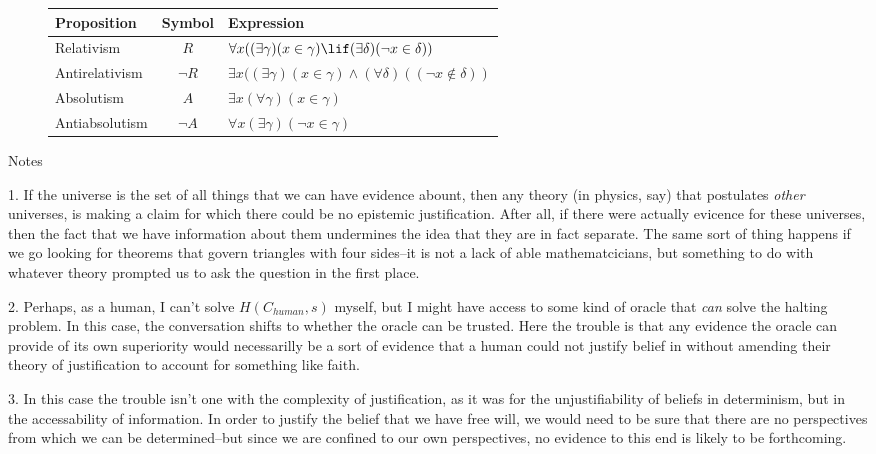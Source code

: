 \documentclass[12pt]{article}
\begin{document}
\begin{flushleft}
\begin{figure}[h]
    \begin{tabular}{l|c|l}
        \hline
        Proposition & Symbol & Expression \\ \hline
        Relativism  & $R$ & $\forall{x}((\exists{\gamma})(x \in \gamma) \lif (\exists{\delta})({\lnot}x \in \delta))$ \\
        Antirelativism & $\neg R$ & $\exists{x}((\exists{\gamma})(x \in \gamma) \land (\forall{\delta})(({\neg}x \notin \delta))$ \\
        Absolutism & $A$ & $\exists{x}(\forall{\gamma})(x \in \gamma)$ \\
        Antiabsolutism & $\neg A$ & $\forall{x}(\exists{\gamma})({\lnot}x \in \gamma)$ \\
    \end{tabular}
\end{figure}

\begin{center}
    Notes
\end{center}
\setlength{\parindent}{0.5in}

1. If the universe is the set of all things that we can have evidence abount, then any theory (in physics, say) that postulates \textit{other} universes, is making a claim for which there could be no epistemic justification.  After all, if there were actually evicence for these universes, then the fact that we have information about them undermines the idea that they are in fact separate.  The same sort of thing happens if we go looking for theorems that govern triangles with four sides--it is not a lack of able mathematcicians, but something to do with whatever theory prompted us to ask the question in the first place.

2. Perhaps, as a human, I can't solve $H(C_{human}, s)$ myself, but I might have access to some kind of oracle that \textit{can} solve the halting problem.  In this case, the conversation shifts to whether the oracle can be trusted.  Here the trouble is that any evidence the oracle can provide of its own superiority would necessarilly be a sort of evidence that a human could not justify belief in without amending their theory of justification to account for something like faith.

3. In this case the trouble isn't one with the complexity of justification, as it was for the unjustifiability of beliefs in determinism, but in the accessability of information.  In order to justify the belief that we have free will, we would need to be sure that there are no perspectives from which we can be determined--but since we are confined to our own perspectives, no evidence to this end is likely to be forthcoming.


\end{flushleft}
\end{document}
